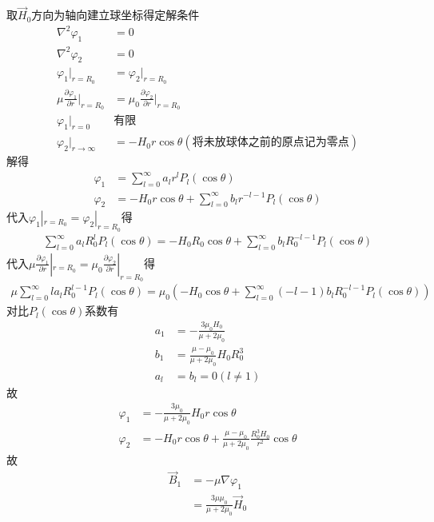 \documentclass{phyasgn}
\begin{document}
\begin{sol}[5]
    取$\vec{H}_0$方向为轴向建立球坐标得定解条件
    \begin{align*}
        \nabla^2\varphi_1&=0\\
        \nabla^2\varphi_2&=0\\
        \varphi_1|_{r=R_0}&=\varphi_2|_{r=R_0}\\
        \mu\frac{\partial \varphi_1}{\partial r}|_{r=R_0}&=\mu_0\frac{\partial \varphi_2}{\partial r}|_{r=R_0}\\
        \varphi_1|_{r=0}&\text{有限}\\
        \varphi_2|_{r\to\infty}&=-H_0r\cos\theta(\text{将未放球体之前的原点记为零点})
    \end{align*}
    解得
    \begin{align*}
        \varphi_1&=\sum_{l=0}^{\infty}a_lr^lP_l(\cos\theta)\\
        \varphi_2&=-H_0r\cos\theta+\sum_{l=0}^{\infty}b_lr^{-l-1}P_l(\cos\theta)
    \end{align*}
    代入$\varphi_1|_{r=R_0}=\varphi_2|_{r=R_0}$得
    \begin{align*}
        \sum_{l=0}^{\infty}a_lR_0^lP_l(\cos\theta)=-H_0R_0\cos\theta+\sum_{l=0}^{\infty}b_lR_0^{-l-1}P_l(\cos\theta)
    \end{align*}
    代入$\mu\frac{\partial \varphi_1}{\partial r}|_{r=R_0}=\mu_0\frac{\partial \varphi_2}{\partial r}|_{r=R_0}$得
    \begin{align*}
        \mu\sum_{l=0}^{\infty}la_lR_0^{l-1}P_l(\cos\theta)=\mu_0(-H_0\cos\theta+\sum_{l=0}^{\infty}(-l-1)b_lR_0^{-l-1}P_l(\cos\theta))
    \end{align*}
    对比$P_l(\cos\theta)$系数有
    \begin{align*}
        a_1&=-\frac{3\mu_0H_0}{\mu+2\mu_0}\\
        b_1&=\frac{\mu-\mu_0}{\mu+2\mu_0}H_0R_0^3\\
        a_l&=b_l=0(l\neq 1)
    \end{align*}
    故
    \begin{align*}
        \varphi_1&=-\frac{3\mu_0}{\mu+2\mu_0}H_0r\cos\theta\\
        \varphi_2&=-H_0r\cos\theta+\frac{\mu-\mu_0}{\mu+2\mu_0}\frac{R_0^3H_0}{r^2}\cos\theta
    \end{align*}
    故
    \begin{align*}
        \vec{B}_1&=-\mu\nabla\varphi_1\\
        &=\frac{3\mu\mu_0}{\mu+2\mu_0}\vec{H}_0
    \end{align*}

\end{sol}
\end{document}
